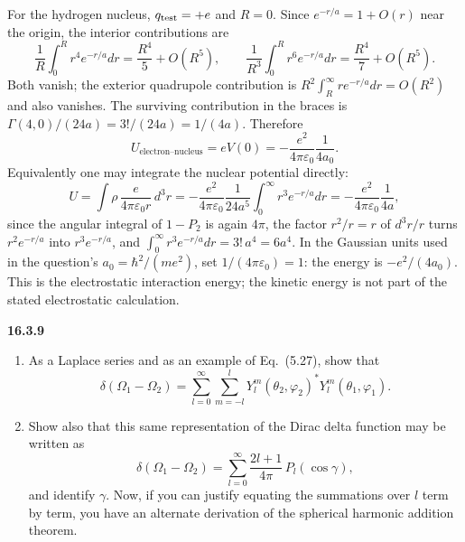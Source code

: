 For the hydrogen nucleus, $q_{\rm test}=+e$ and $R=0$.
Since $e^{-r/a}=1+O(r)$ near the origin, the interior contributions are
\[
\frac1R\int_0^R r^4e^{-r/a}dr
=\frac{R^4}{5}+O(R^5),\qquad
\frac1{R^3}\int_0^R r^6e^{-r/a}dr
=\frac{R^4}{7}+O(R^5).
\]
Both vanish; the exterior quadrupole contribution is
$R^2\int_R^\infty re^{-r/a}dr=O(R^2)$ and also vanishes.
The surviving contribution in the braces is
$\Gamma(4,0)/(24a)=3!/(24a)=1/(4a)$. Therefore
\[
\boxed{U_{\text{electron--nucleus}}
=eV(0)=-\frac{e^2}{4\pi\varepsilon_0}\frac1{4a_0}}.
\]
Equivalently one may integrate the nuclear potential directly:
\[
U=\int\rho\,\frac{e}{4\pi\varepsilon_0 r}\,d^3r
=-\frac{e^2}{4\pi\varepsilon_0}\frac1{24a^5}
\int_0^\infty r^3e^{-r/a}dr
=-\frac{e^2}{4\pi\varepsilon_0}\frac1{4a},
\]
since the angular integral of $1-P_2$ is again $4\pi$, the factor
$r^2/r=r$ of $d^3r/r$ turns $r^2e^{-r/a}$ into $r^3e^{-r/a}$, and
$\int_0^\infty r^3e^{-r/a}dr=3!\,a^4=6a^4$.
In the Gaussian units used in the question's $a_0=\hbar^2/(me^2)$,
set $1/(4\pi\varepsilon_0)=1$: the energy is $-e^2/(4a_0)$.
This is the electrostatic interaction energy; the kinetic energy
is not part of the stated electrostatic calculation.

\par\bigskip
\noindent\textbf{16.3.9}\quad
{}
\begin{enumerate}
\item[(a)] As a Laplace series and as an example of Eq.~(5.27), show
that
\[
\delta(\Omega_{1}-\Omega_{2})
=\sum_{l=0}^{\infty}\sum_{m=-l}^{l}
Y_{l}^{m}(\theta_{2},\varphi_{2})^{*}Y_{l}^{m}(\theta_{1},\varphi_{1}).
\]
\item[(b)] Show also that this same representation of the Dirac delta
function may be written as
\[
\delta(\Omega_{1}-\Omega_{2})
=\sum_{l=0}^{\infty}\frac{2l+1}{4\pi}\,P_{l}(\cos\gamma),
\]
and identify $\gamma$. Now, if you can justify equating the summations
over $l$ term by term, you have an alternate derivation of the
spherical harmonic addition theorem.
\end{enumerate}
\solution
{}

